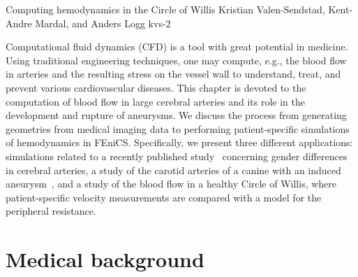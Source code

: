               {Computing hemodynamics in the Circle of Willis}
              {Kristian Valen-Sendstad, Kent-Andre Mardal, and Anders Logg}
              {kvs-2}

Computational fluid dynamics (CFD) is a tool with great potential in
medicine. Using traditional engineering techniques, one may compute,
e.g., the blood flow in arteries and the resulting stress on the
vessel wall to understand, treat, and prevent various cardiovascular
diseases. This chapter is devoted to the computation of blood flow in
large cerebral arteries and its role in the development and rupture of
aneurysms. We discuss the process from generating geometries from
medical imaging data to performing patient-specific simulations of
hemodynamics in FEniCS.  Specifically, we present three different
applications: simulations related to a recently published
study~\cite{kvs-sex} concerning gender differences in cerebral
arteries, a study of the carotid arteries of a canine with an induced
aneurysm~\cite{doggy}, and a study of the blood flow in a healthy
Circle of Willis, where patient-specific velocity measurements are
compared with a model for the peripheral resistance.

\section{Medical background} \label{Medical_Background}

